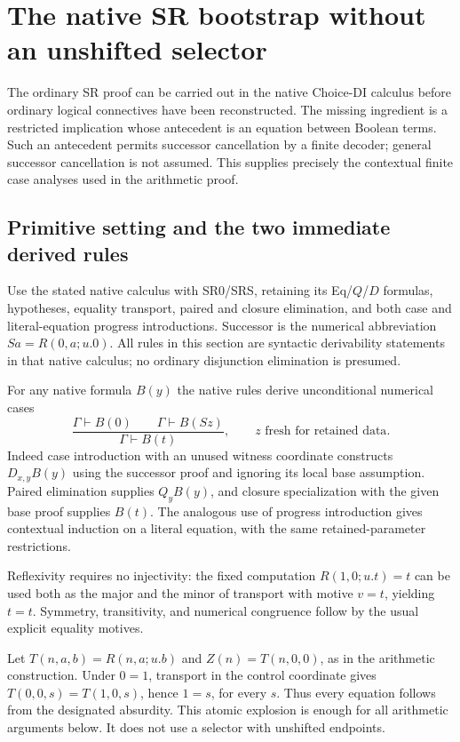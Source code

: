 \section{The native SR bootstrap without an unshifted selector}
\label{sec:native-sr-bootstrap}

The ordinary SR proof can be carried out in the native Choice-DI
calculus before ordinary logical connectives have been reconstructed.
The missing ingredient is a restricted implication whose antecedent is
an equation between Boolean terms.  Such an antecedent permits successor
cancellation by a finite decoder; general successor cancellation is not
assumed.  This supplies precisely the contextual finite case analyses
used in the arithmetic proof.

\subsection{Primitive setting and the two immediate derived rules}

Use the stated native calculus with SR0/SRS, retaining its
Eq/$Q$/$D$ formulas, hypotheses, equality transport, paired and closure
elimination, and both case and literal-equation progress introductions.
Successor is the numerical abbreviation $Sa=R(0,a;u.0)$.
All rules in this section are syntactic derivability statements in that
native calculus; no ordinary disjunction elimination is presumed.

For any native formula $B(y)$ the native rules derive unconditional
numerical cases
\[
 \frac{\Gamma\vdash B(0)\qquad\Gamma\vdash B(Sz)}
      {\Gamma\vdash B(t)},\qquad z\text{ fresh for retained data}.
 \tag{NC}\label{eq:native-sr-NC}
\]
Indeed case introduction with an unused witness coordinate constructs
$D_{x,y}B(y)$ using the successor proof and ignoring its local base
assumption.  Paired elimination supplies $Q_yB(y)$, and closure
specialization with the given base proof supplies $B(t)$.
The analogous use of progress introduction gives contextual induction
on a literal equation, with the same retained-parameter restrictions.

Reflexivity requires no injectivity: the fixed computation
$R(1,0;u.t)=t$ can be used both as the major and the minor of transport
with motive $v=t$, yielding $t=t$.  Symmetry, transitivity, and numerical
congruence follow by the usual explicit equality motives.

Let $T(n,a,b)=R(n,a;u.b)$ and $Z(n)=T(n,0,0)$, as in the arithmetic
construction.  Under $0=1$, transport in the control coordinate gives
$T(0,0,s)=T(1,0,s)$, hence $1=s$, for every $s$.  Thus every equation
follows from the designated absurdity.  This atomic explosion is enough
for all arithmetic arguments below.  It does not use a selector with
unshifted endpoints.

